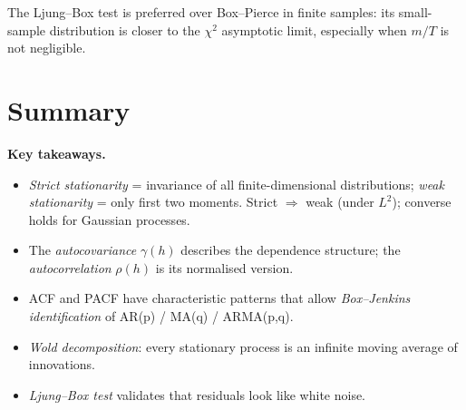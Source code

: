 \begin{warnbox}
The Ljung--Box test is preferred over Box--Pierce in finite samples:
its small-sample distribution is closer to the $\chi^2$ asymptotic
limit, especially when $m / T$ is not negligible.
\end{warnbox}

\section*{Summary}

\noindent\textbf{Key takeaways.}
\begin{itemize}
  \item \emph{Strict stationarity} = invariance of all finite-dimensional
        distributions; \emph{weak stationarity} = only first two moments.
        Strict $\Rightarrow$ weak (under $L^2$); converse holds for
        Gaussian processes.
  \item The \emph{autocovariance} $\gamma(h)$ describes the dependence
        structure; the \emph{autocorrelation} $\rho(h)$ is its
        normalised version.
  \item ACF and PACF have characteristic patterns that allow
        \emph{Box--Jenkins identification} of AR(p) / MA(q) / ARMA(p,q).
  \item \emph{Wold decomposition}: every stationary process is an
        infinite moving average of innovations.
  \item \emph{Ljung--Box test} validates that residuals look like
        white noise.
\end{itemize}
